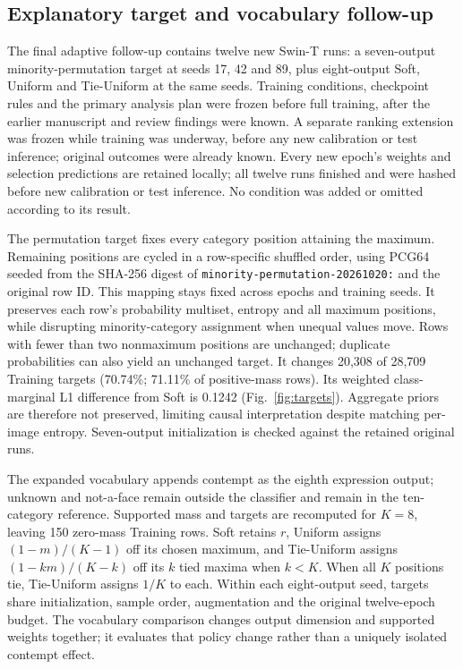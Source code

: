 \subsection{Explanatory target and vocabulary follow-up}\label{sec:followup}
The final adaptive follow-up contains twelve new Swin-T runs: a seven-output minority-permutation target at seeds 17, 42 and 89, plus eight-output Soft, Uniform and Tie-Uniform at the same seeds. Training conditions, checkpoint rules and the primary analysis plan were frozen before full training, after the earlier manuscript and review findings were known. A separate ranking extension was frozen while training was underway, before any new calibration or test inference; original outcomes were already known. Every new epoch's weights and selection predictions are retained locally; all twelve runs finished and were hashed before new calibration or test inference. No condition was added or omitted according to its result.

The permutation target fixes every category position attaining the maximum. Remaining positions are cycled in a row-specific shuffled order, using PCG64 seeded from the SHA-256 digest of \texttt{minority-permutation-20261020:} and the original row ID. This mapping stays fixed across epochs and training seeds. It preserves each row's probability multiset, entropy and all maximum positions, while disrupting minority-category assignment when unequal values move. Rows with fewer than two nonmaximum positions are unchanged; duplicate probabilities can also yield an unchanged target. It changes 20,308 of 28,709 Training targets (70.74\%; 71.11\% of positive-mass rows). Its weighted class-marginal L1 difference from Soft is 0.1242 (Fig.~\ref{fig:targets}). Aggregate priors are therefore not preserved, limiting causal interpretation despite matching per-image entropy. Seven-output initialization is checked against the retained original runs.

The expanded vocabulary appends contempt as the eighth expression output; unknown and not-a-face remain outside the classifier and remain in the ten-category reference. Supported mass and targets are recomputed for $K=8$, leaving 150 zero-mass Training rows. Soft retains $r$, Uniform assigns $(1-m)/(K-1)$ off its chosen maximum, and Tie-Uniform assigns $(1-km)/(K-k)$ off its $k$ tied maxima when $k<K$. When all $K$ positions tie, Tie-Uniform assigns $1/K$ to each. Within each eight-output seed, targets share initialization, sample order, augmentation and the original twelve-epoch budget. The vocabulary comparison changes output dimension and supported weights together; it evaluates that policy change rather than a uniquely isolated contempt effect.

